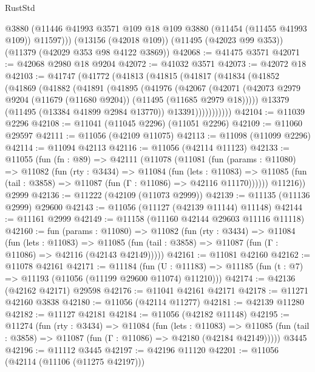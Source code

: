 \begin{lexlean}{RustStd}
\begin{coremodule}
        @3880
        (@11446 @41993 @3571 @109 @18 @109 @3880 (@11454 (@11455 @41993 @109)) @11597)))
    (@13156 (@42018 @109))
    (@11495 (@42023 @99 @353))
    (@11379 (@42029 @353 @98 @4122 @3869))
@42068 := @41475 @3571
@42071 := @42068 @2980 @18 @9204
@42072 := @41032 @3571
@42073 := @42072 @18
@42103 := @41747
    (@41772
      (@41813
        (@41815
          (@41817
            (@41834
              (@41852
                (@41869
                  (@41882
                    (@41891
                      (@41895
                        (@41976
                          (@42067
                            (@42071
                              (@42073
                                @2979
                                @9204
                                (@11679 (@11680 @9204))
                                (@11495 (@11685 @2979 @18)))))
                          @13379
                          (@11495 (@13384 @41899 @2984 @13770))
                          @13391)))))))))))
@42104 := @11039 @2296
@42108 := @11041 (@11045 @2296) (@11051 @2296)
@42109 := @11060 @29597
@42111 := @11056 (@42109 @11075)
@42113 := @11098 (@11099 @2296)
@42114 := @11094 @42113
@42116 := @11056 (@42114 @11123)
@42133 := @11055
    (fun (fn : @89) =>
    @42111
      (@11078
        (@11081
          (fun (params : @11080) =>
          @11082
            (fun (rty : @3434) =>
            @11084
              (fun (lets : @11083) =>
              @11085 (fun (tail : @3858) => @11087 (fun (Γ : @11086) => @42116 @11170))))))
        @11216))
    @2999
@42136 := @11222 (@42109 (@11073 @2999))
@42139 := @11135 (@11136 @2999) @29600
@42143 := @11056 (@11127 (@42139 @11144) @11148)
@42144 := @11161 @2999
@42149 := @11158 (@11160 @42144 @29603 @11116 @11118)
@42160 := fun (params : @11080) =>
  @11082
    (fun (rty : @3434) =>
    @11084
      (fun (lets : @11083) =>
      @11085 (fun (tail : @3858) => @11087 (fun (Γ : @11086) => @42116 (@42143 @42149)))))
@42161 := @11081 @42160
@42162 := @11078 @42161
@42171 := @11184
    (fun (U : @11183) => @11185 (fun (t : @7) => @11193 (@11056 (@11199 @29600 @11074) @11210)))
@42174 := @42136 (@42162 @42171) @29598
@42176 := @11041 @42161 @42171
@42178 := @11271 @42160 @3838
@42180 := @11056 (@42114 @11277)
@42181 := @42139 @11280
@42182 := @11127 @42181
@42184 := @11056 (@42182 @11148)
@42195 := @11274
    (fun (rty : @3434) =>
    @11084
      (fun (lets : @11083) =>
      @11085 (fun (tail : @3858) => @11087 (fun (Γ : @11086) => @42180 (@42184 @42149)))))
    @3445
@42196 := @11112 @3445
@42197 := @42196 @11120
@42201 := @11056 (@42114 (@11106 (@11275 @42197)))

\end{coremodule}
\end{lexlean}
